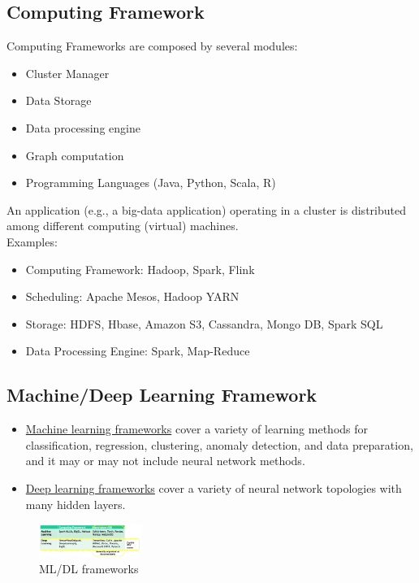 \documentclass[10pt, oneside]{article}
\begin{document}
\begin{multicols}{2}
    \subsection{Computing Framework}
    Computing Frameworks are composed by several modules:\begin{itemize}
        \item Cluster Manager
        \item Data Storage
        \item Data processing engine
        \item Graph computation
        \item Programming Languages (Java, Python, Scala, R)
    \end{itemize}
    An application (e.g., a big-data application) operating in a cluster is distributed among different computing (virtual) machines.\\
    Examples:\begin{itemize}
        \item Computing Framework: Hadoop, Spark, Flink
        \item Scheduling: Apache Mesos, Hadoop YARN
        \item Storage: HDFS, Hbase, Amazon S3, Cassandra, Mongo DB, Spark SQL
        \item Data Processing Engine: Spark, Map-Reduce
    \end{itemize}
    \subsection{Machine/Deep Learning Framework}
    \begin{itemize}
        \item \underline{Machine learning frameworks} cover a variety of learning methods for classification, regression, clustering, anomaly detection, and data preparation, and it may or may not include neural network methods.
        \item \underline{Deep learning frameworks} cover a variety of neural network topologies with many hidden layers.
    \end{itemize}
    \begin{figure}[H]
        \begin{center}
        \includegraphics[width=0.3\textwidth]{img/img55.png}
        \caption{ML/DL frameworks}
        \label{fig:ML/DL frameworks}
        \end{center}
    \end{figure}
\end{multicols}
\end{document}
